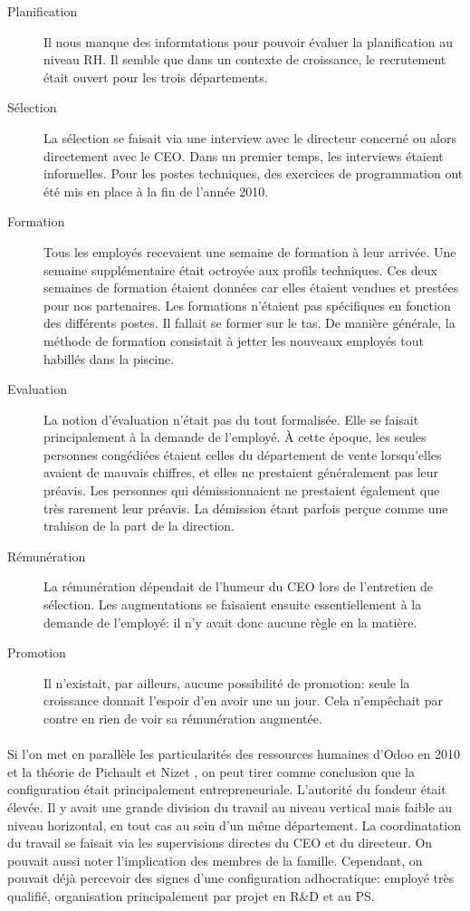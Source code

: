 \begin{description}
    \item[Planification] Il nous manque des informtations pour pouvoir évaluer la planification au niveau RH. Il semble que dans un contexte de croissance, le recrutement était ouvert pour les trois départements.
    \item[Sélection] La sélection se faisait via une interview avec le directeur concerné ou alors directement avec le CEO. Dans un premier temps, les interviews étaient informelles. Pour les postes techniques, des exercices de programmation ont été mis en place à la fin de l'année 2010.
    \item[Formation] Tous les employés recevaient une semaine de formation à leur arrivée. Une semaine supplémentaire était octroyée aux profils techniques. Ces deux semaines de formation étaient données car elles étaient vendues et prestées pour nos partenaires. Les formations n'étaient pas spécifiques en fonction des différents postes. Il fallait se former sur le tas. De manière générale, la méthode de formation consistait à jetter les nouveaux employés tout habillés dans la piscine.
    \item[Evaluation] La notion d'évaluation n'était pas du tout formalisée. Elle se faisait principalement à la demande de l'employé. À cette époque, les seules personnes congédiées étaient celles du département de vente lorsqu'elles avaient de mauvais chiffres, et elles ne prestaient généralement pas leur préavis. Les personnes qui démissionnaient ne prestaient également que très rarement leur préavis. La démission étant parfois perçue comme une trahison de la part de la direction.
    \item[Rémunération] La rémunération dépendait de l'humeur du CEO lors de l'entretien de sélection. Les augmentations se faisaient ensuite essentiellement à la demande de l'employé: il n'y avait donc aucune règle en la matière. 
    \item[Promotion] Il n'existait, par ailleurs, aucune possibilité de promotion: seule la croissance donnait l'espoir d'en avoir une un jour. Cela n'empêchait par contre en rien de voir sa rémunération augmentée. 
\end{description}

 

\paragraph{}Si l'on met en parallèle les particularités des ressources humaines d'Odoo en 2010 et la théorie de Pichault et Nizet \citep[pp. 48-49]{pichault}, on peut tirer comme conclusion que la configuration était principalement entrepreneuriale. L'autorité du fondeur était élevée. Il y avait une grande division du travail au niveau vertical mais faible au niveau horizontal, en tout cas au sein d'un même département. La coordinatation du travail se faisait via les supervisions directes du CEO et du directeur. On pouvait aussi noter l'implication des membres de la famille. Cependant, on pouvait déjà percevoir des signes d'une configuration adhocratique: employé très qualifié, organisation principalement par projet en R\&D et au PS. 

